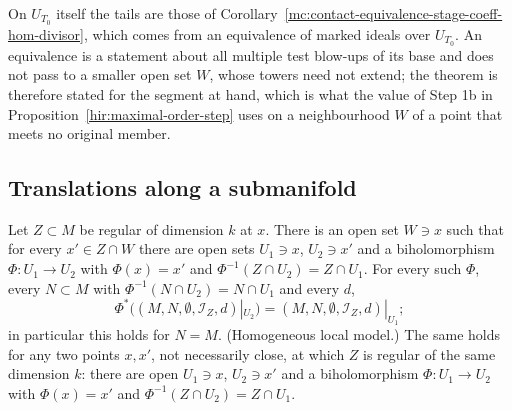 On \(U_{T_0}\) itself the tails are those of Corollary~\ref{mc:contact-equivalence-stage-coeff-hom-divisor}, which comes from an equivalence of marked ideals over \(U_{T_0}\).
An equivalence is a statement about all multiple test blow-ups of its base and does not pass to a smaller open set \(W\), whose towers need not extend; the theorem
is therefore stated for the segment at hand, which is what the value of Step 1b in Proposition~\ref{hir:maximal-order-step} uses on a neighbourhood \(W\) of a point
that meets no original member.

\subsection{Translations along a submanifold}

\begin{lemma}
\label{mc:smooth-centre-translation}
\leanok
Let \(Z\subset M\) be regular of dimension \(k\) at \(x\). There is an open set \(W\ni x\) such that for every \(x'\in Z\cap W\) there are open sets \(U_1\ni x\),
\(U_2\ni x'\) and a biholomorphism \(\Phi\colon U_1\to U_2\) with \(\Phi(x)=x'\) and \(\Phi^{-1}(Z\cap U_2)=Z\cap U_1\). For every such \(\Phi\), every \(N\subset M\) with
\(\Phi^{-1}(N\cap U_2)=N\cap U_1\) and every \(d\),
\[\Phi^*\bigl((M,N,\emptyset,\mathcal I_Z,d)|_{U_2}\bigr)=(M,N,\emptyset,\mathcal I_Z,d)|_{U_1};\]
in particular this holds for \(N=M\). (Homogeneous local model.) The same holds for any two points \(x,x'\), not necessarily close, at which \(Z\) is
regular of the same dimension \(k\): there are open \(U_1\ni x\), \(U_2\ni x'\) and a biholomorphism \(\Phi\colon U_1\to U_2\) with \(\Phi(x)=x'\) and
\(\Phi^{-1}(Z\cap U_2)=Z\cap U_1\).
\end{lemma}
